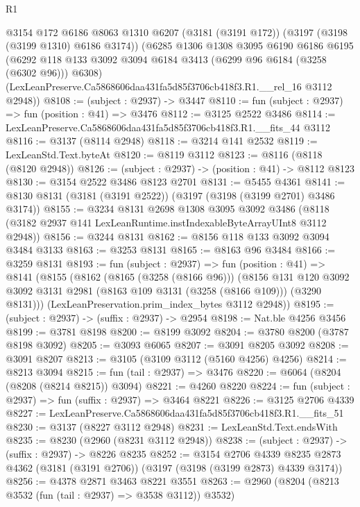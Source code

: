 \begin{lexlean}{R1}
\begin{coremodule}
  @3154
    @172
    @6186
    @8063
    @1310
    @6207
    (@3181 (@3191 @172))
    (@3197 (@3198 (@3199 @1310) @6186 @3174))
    (@6285
      @1306
      @1308
      @3095
      @6190
      @6186
      @6195
      (@6292 @118 @133 @3092 @3094 @6184 @3413 (@6299 @96 @6184 (@3258 (@6302 @96))) @6308)
      (LexLeanPreserve.Ca5868606daa431fa5d85f3706cb418f3.R1.__rel_16 @3112 @2948))
@8108 := (subject : @2937) -> @3447
@8110 := fun (subject : @2937) => fun (position : @41) => @3476
@8112 := @3125 @2522 @3486
@8114 := LexLeanPreserve.Ca5868606daa431fa5d85f3706cb418f3.R1.__fits_44 @3112
@8116 := @3137 (@8114 @2948)
@8118 := @3214 @141 @2532
@8119 := LexLeanStd.Text.byteAt
@8120 := @8119 @3112
@8123 := @8116 (@8118 (@8120 @2948))
@8126 := (subject : @2937) -> (position : @41) -> @8112 @8123
@8130 := @3154 @2522 @3486 @8123 @2701
@8131 := @5455 @4361
@8141 := @8130 @8131 (@3181 (@3191 @2522)) (@3197 (@3198 (@3199 @2701) @3486 @3174))
@8155 := @3234
    @8131
    @2698
    @1308
    @3095
    @3092
    @3486
    (@8118 (@3182 @2937 @141 LexLeanRuntime.instIndexableByteArrayUInt8 @3112 @2948))
@8156 := @3244 @8131
@8162 := @8156 @118 @133 @3092 @3094 @3484 @3133
@8163 := @3253 @8131
@8165 := @8163 @96 @3484
@8166 := @3259 @8131
@8193 := fun (subject : @2937) =>
  fun (position : @41) =>
  @8141
    (@8155
      (@8162
        (@8165 (@3258 (@8166 @96)))
        (@8156
          @131
          @120
          @3092
          @3092
          @3131
          @2981
          (@8163 @109 @3131 (@3258 (@8166 @109)))
          (@3290 @8131)))
      (LexLeanPreservation.prim_index_bytes @3112 @2948))
@8195 := (subject : @2937) -> (suffix : @2937) -> @2954
@8198 := Nat.ble @4256 @3456
@8199 := @3781 @8198
@8200 := @8199 @3092
@8204 := @3780 @8200 (@3787 @8198 @3092)
@8205 := @3093 @6065
@8207 := @3091 @8205 @3092
@8208 := @3091 @8207
@8213 := @3105 (@3109 @3112 (@5160 @4256) @4256)
@8214 := @8213 @3094
@8215 := fun (tail : @2937) => @3476
@8220 := @6064 (@8204 (@8208 (@8214 @8215)) @3094)
@8221 := @4260 @8220
@8224 := fun (subject : @2937) => fun (suffix : @2937) => @3464 @8221
@8226 := @3125 @2706 @4339
@8227 := LexLeanPreserve.Ca5868606daa431fa5d85f3706cb418f3.R1.__fits_51
@8230 := @3137 (@8227 @3112 @2948)
@8231 := LexLeanStd.Text.endsWith
@8235 := @8230 (@2960 (@8231 @3112 @2948))
@8238 := (subject : @2937) -> (suffix : @2937) -> @8226 @8235
@8252 := @3154
    @2706
    @4339
    @8235
    @2873
    @4362
    (@3181 (@3191 @2706))
    (@3197 (@3198 (@3199 @2873) @4339 @3174))
@8256 := @4378 @2871 @3463 @8221 @3551
@8263 := @2960 (@8204 (@8213 @3532 (fun (tail : @2937) => @3538 @3112)) @3532)

\end{coremodule}
\end{lexlean}
